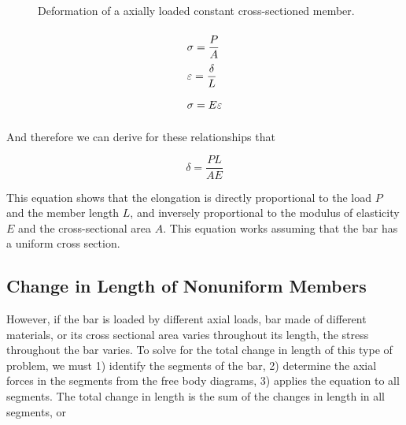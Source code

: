 \documentclass[
10pt,
a4paper,
openany,
svgnames,
]{book} %
\begin{document}
\begin{figure}[h]
  \centering
  \caption{Deformation of a axially loaded constant cross-sectioned member.}
\end{figure}

\[\arraycolsep=1.4pt\def\arraystretch{2.2}
  \begin{array}{l}
    \sigma  = \dfrac{P}{A}\\
    \varepsilon  = \dfrac{\delta }{L}\\
    \sigma  = E\varepsilon 
  \end{array}\]

And therefore we can derive for these relationships that

\begin{equation}
  \delta  = \frac{PL}{AE}
\end{equation}

This equation shows that the elongation is directly proportional to the load $P$ and the member length $L$, and inversely proportional to the modulus of elasticity $E$ and the cross-sectional area $A$. This equation works assuming that the bar has a uniform cross section.

\subsection{Change in Length of Nonuniform Members}

However, if the bar is loaded by different axial loads, bar made of different materials, or its cross sectional area varies throughout its length, the stress throughout the bar varies. To solve for the total change in length of this type of problem, we must 1) identify the segments of the bar, 2) determine the axial forces in the segments from the free body diagrams, 3) applies the equation to all segments. The total change in length is the sum of the changes in length in all segments, or
\end{document}
